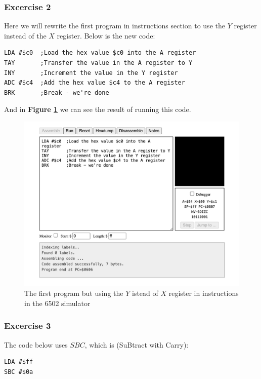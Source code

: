\documentclass[a4paper]{article}
\begin{document}
\subsubsection{Excercise 2}

Here we will rewrite the first program in instructions section to use the $Y$ register instead of the $X$ register. Below is the new code:

\begin{lstlisting}[style=6502asm]
LDA #$c0  ;Load the hex value $c0 into the A register
TAY       ;Transfer the value in the A register to Y
INY       ;Increment the value in the Y register
ADC #$c4  ;Add the hex value $c4 to the A register
BRK       ;Break - we're done
\end{lstlisting}

And in \textbf{Figure \ref{fig:23-ex2}} we can see the result of running this code.

\begin{figure}[H]
    \centering
    \includegraphics[width=1.0\textwidth]{res/images/q2/23-ex2.png}
    \caption{The first program but using the $Y$ istead of $X$ register in instructions in the 6502 simulator}
    \label{fig:23-ex2}
\end{figure}

\subsubsection{Excercise 3}

The code below uses $SBC$, which is (SuBtract with Carry):

\begin{lstlisting}[style=6502asm]
LDA #$ff
SBC #$0a
\end{lstlisting}
\end{document}
